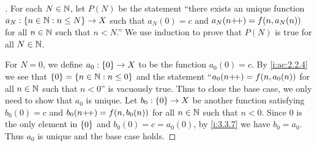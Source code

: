 \begin{proof}[]
  For each \(N \in \mathbb{N}\), let \(P(N)\) be the statement ``there exists an unique function \(a_N : \left\lbrace n \in \mathbb{N} : n \leq N\right\rbrace \to X\) such that \(a_N(0) = c\) and \(a_N(n{+}\!{+}) = f(n, a_N(n))\) for all \(n \in \mathbb{N}\) such that \(n < N\).''
  We use induction to prove that \(P(N)\) is true for all \(N \in \mathbb{N}\).

  For \(N = 0\), we define \(a_0 : \left\lbrace0\right\rbrace \to X\) to be the function \(a_0(0) = c\).
  By \cref{i:ac:2.2.4} we see that \(\left\lbrace0\right\rbrace = \left\lbrace n \in \mathbb{N} : n \leq 0\right\rbrace\) and the statement ``\(a_0(n{+}\!{+}) = f(n, a_0(n))\) for all \(n \in \mathbb{N}\) such that \(n < 0\)'' is vacuously true.
  Thus to close the base case, we only need to show that \(a_0\) is unique.
  Let \(b_0 : \left\lbrace0\right\rbrace \to X\) be another function satisfying \(b_0(0) = c\) and \(b_0(n{+}\!{+}) = f(n, b_0(n))\) for all \(n \in \mathbb{N}\) such that \(n < 0\).
  Since \(0\) is the only element in \(\left\lbrace0\right\rbrace\) and \(b_0(0) = c = a_0(0)\), by \cref{i:3.3.7} we have \(b_0 = a_0\).
  Thus \(a_0\) is unique and the base case holds.


\end{proof}
